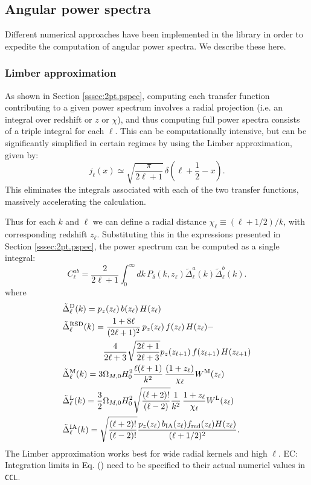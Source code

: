 \documentclass[\docopts]{\docclass}
\newcommand{\elisa}[1]{\textcolor{green!10!orange!90!}{EC: #1}}
\newcommand{\ccl}{{\tt CCL}\xspace}
\begin{document}
\subsection{Angular power spectra}

Different numerical approaches have been implemented in the library in order to expedite the computation of angular power spectra. We describe these here.

\subsubsection{Limber approximation}

As shown in Section \ref{sssec:2pt.pspec}, computing each transfer function contributing to a given power spectrum involves a radial projection (i.e. an integral over redshift or $z$ or $\chi$), and thus computing full power spectra consists of a triple integral for each $\ell$. This can be computationally intensive, but can be significantly simplified in certain regimes by using the Limber approximation, given by:
\begin{equation}
 j_\ell(x)\simeq\sqrt{\frac{\pi}{2\ell+1}}\,\delta\left(\ell+\frac{1}{2}-x\right).
\end{equation}
This eliminates the integrals associated with each of the two transfer functions, massively accelerating the calculation.

Thus for each $k$ and $\ell$ we can define a radial distance $\chi_\ell\equiv(\ell+1/2)/k$, with corresponding redshift $z_\ell$. Substituting this in the expressions presented in Section \ref{sssec:2pt.pspec}, the power spectrum can be computed as a single integral:
\begin{equation}\label{eq:limber}
 C^{ab}_\ell=\frac{2}{2\ell+1}\int_0^\infty dk\,P_\delta\left(k,z_\ell\right)
 \tilde{\Delta}^a_\ell(k)\tilde{\Delta}^b_\ell(k).
\end{equation}
where
\begin{align}
 &\tilde{\Delta}_\ell^{\rm D}(k)=p_z(z_\ell)\,b(z_\ell)\,H(z_\ell)\\
 &\tilde{\Delta}_\ell^{\rm RSD}(k)=
 \frac{1+8\ell}{(2\ell+1)^2}\,p_z(z_\ell)\,f(z_\ell)\,H(z_\ell)-\\\nonumber
 &\hspace{48pt}\frac{4}{2\ell+3}\sqrt{\frac{2\ell+1}{2\ell+3}}p_z(z_{\ell+1})\,f(z_{\ell+1})\,H(z_{\ell+1})\\
 &\tilde{\Delta}_\ell^{\rm M}(k)=3\Omega_{M,0}H_0^2\frac{\ell(\ell+1)}{k^2}\,
 \frac{(1+z_\ell)}{\chi_\ell}W^{\rm M}(z_\ell)\\
 &\tilde{\Delta}_\ell^{\rm L}(k)=\frac{3}{2}\Omega_{M,0}H_0^2\sqrt{\frac{(\ell+2)!}{(\ell-2)}}\frac{1}{k^2}\,
 \frac{1+z_\ell}{\chi_\ell}W^{\rm L}(z_\ell)\\
 &\tilde{\Delta}_\ell^{\rm IA}(k)=\sqrt{\frac{(\ell+2)!}{(\ell-2)!}}\frac{p_z(z_\ell)\,b_{\rm IA}(z_\ell)f_{\rm red}(z_\ell)H(z_\ell)}{(\ell+1/2)^2}.
\end{align}
The Limber approximation works best for wide radial kernels and high $\ell$. \elisa{Integration limits in Eq. (\label{eq:limber}) need to be specified to their actual numericl values in \ccl.}
\end{document}
